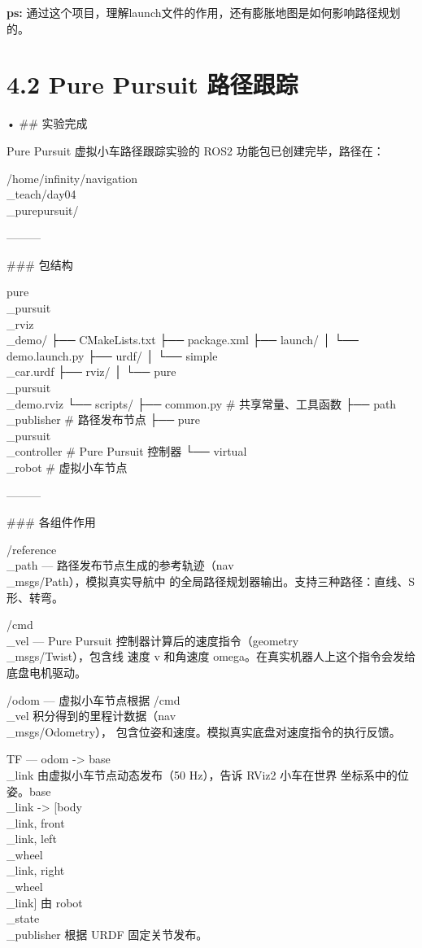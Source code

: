 \documentclass[a4paper,12pt]{book}
\begin{document}
{\textbf{ps:} 通过这个项目，理解launch文件的作用，还有膨胀地图是如何影响路径规划的。

\section{4.2 Pure Pursuit 路径跟踪}

• ## 实验完成

  Pure Pursuit 虚拟小车路径跟踪实验的 ROS2 功能包已创建完毕，路径在：

  /home/infinity/navigation\\_teach/day04\\_purepursuit/

  ———

  ### 包结构

  pure\\_pursuit\\_rviz\\_demo/
  ├── CMakeLists.txt
  ├── package.xml
  ├── launch/
  │   └── demo.launch.py
  ├── urdf/
  │   └── simple\\_car.urdf
  ├── rviz/
  │   └── pure\\_pursuit\\_demo.rviz
  └── scripts/
      ├── common.py              # 共享常量、工具函数
      ├── path\\_publisher         # 路径发布节点
      ├── pure\\_pursuit\\_controller # Pure Pursuit 控制器
      └── virtual\\_robot          # 虚拟小车节点

  ———

  ### 各组件作用

  /reference\\_path — 路径发布节点生成的参考轨迹（nav\\_msgs/Path），模拟真实导航中
  的全局路径规划器输出。支持三种路径：直线、S 形、转弯。

  /cmd\\_vel — Pure Pursuit 控制器计算后的速度指令（geometry\\_msgs/Twist），包含线
  速度 v 和角速度 omega。在真实机器人上这个指令会发给底盘电机驱动。

  /odom — 虚拟小车节点根据 /cmd\\_vel 积分得到的里程计数据（nav\\_msgs/Odometry），
  包含位姿和速度。模拟真实底盘对速度指令的执行反馈。

  TF — odom -> base\\_link 由虚拟小车节点动态发布（50 Hz），告诉 RViz2 小车在世界
  坐标系中的位姿。base\\_link -> [body\\_link, front\\_link, left\\_wheel\\_link,
  right\\_wheel\\_link] 由 robot\\_state\\_publisher 根据 URDF 固定关节发布。

}
\end{document}
